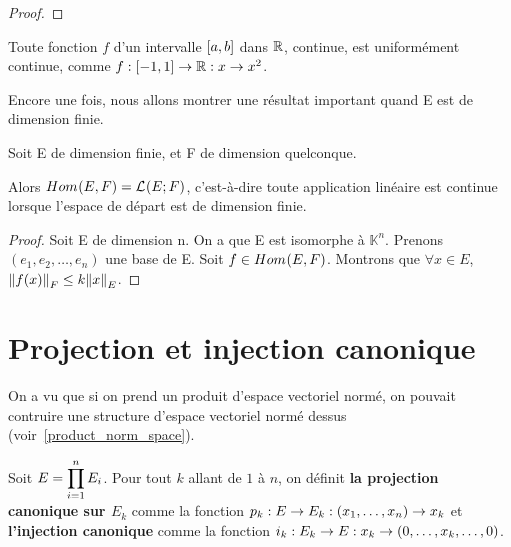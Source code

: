 \ifdefined\outputproof
\begin{proof}

\end{proof}
\fi

\begin{exemple}
	Toute fonction $f$ d'un intervalle $\left[a, b\right]$ dans $
\mathbb{R}$, continue, est
	uniformément continue, comme
	$f : \left[-1, 1\right] \rightarrow 
\mathbb{R} : x \rightarrow x^2$.
\end{exemple}

Encore une fois, nous allons montrer une résultat important quand E est de
dimension finie.

\begin{proposition}
	Soit E de dimension finie, et F de dimension quelconque.

	Alors $Hom_{}(E, F) = \mathcal{L}_{}(E; F)$, c'est-à-dire toute
	application linéaire est continue lorsque l'espace de départ est de
	dimension finie.
\end{proposition}

\ifdefined\outputproof
\begin{proof}
	Soit E de dimension n.
	On a que E est isomorphe à $\mathbb{K}^{n}$. Prenons $(e_{1}, e_{2}, \ldots,
	e_{n})$ une base de E.
	Soit $f \in Hom_{}(E, F)$. Montrons que $\forall x \in E$,
	$\norm{f(x)}_{F} \leq k\norm{x}_{E}$.
\end{proof}
\fi

\section{Projection et injection canonique}

On a vu que si on prend un produit d'espace vectoriel normé, on pouvait
contruire une structure d'espace vectoriel normé dessus (voir~\ref{product_norm_space}).


\begin{definition} 
	\label{injection_projection_definition}
	Soit $E =  \displaystyle \prod_{i = 1}^{n} E_{i}$.
	Pour tout $k$ allant de $1$ à $n$, on définit \textbf{la projection
		canonique sur $E_{k}$} comme la fonction
		$p_{k} : E \rightarrow E_{k} : (x_{1}, \ldots, x_{n}) \rightarrow
		x_{k}$ et \textbf{l'injection canonique}
		comme la fonction $i_{k} : E_{k} \rightarrow E : x_{k}
		\rightarrow (0, \ldots, x_{k}, \ldots, 0)$.
\end{definition}


